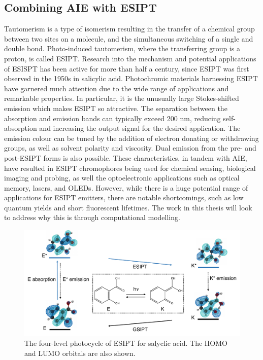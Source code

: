 \subsection{Combining AIE with ESIPT}
Tautomerism is a type of isomerism resulting in the transfer of a chemical group between two sites on a molecule, and the simultaneous switching of a single and double bond. Photo-induced tautomerism, where the transferring group is a proton, is called \acf{ESIPT}. Research into the mechanism and potential applications of ESISPT has been active for more than half a century, since \ac{ESIPT} was first observed in the 1950s in salicylic acid.\cite{Weller1955} Photochromic materials harnessing \ac{ESIPT} have garnered much attention due to the wide range of applications and remarkable properties. In particular, it is the unusually large Stokes-shifted emission which makes \ac{ESIPT} so attractive. The separation between the absorption and emission bands can typically exceed 200 nm, reducing self-absorption and increasing the output signal for the desired application. The emission colour can be tuned by the addition of electron donating or withdrawing groups, as well as solvent polarity and viscosity.\cite{Azarias2016,Yushchenko2007} Dual emission from the pre- and post-\ac{ESIPT} forms is also possible. These characteristics, in tandem with \ac{AIE}, have resulted in \ac{ESIPT} chromophores being used for chemical sensing, biological imaging and probing, as well the optoelectronic applications such as optical memory, lasers, and \acp{OLED}.\cite{Hsieh2010,Kwon2011,Zhao2012,Demchenko2013,Padalkar2015,Chen2018} However, while there is a huge potential range of applications for ESIPT emitters, there are notable shortcomings, such as low quantum yields and short fluorescent lifetimes.\cite{Padalkar2015} The work in this thesis will look to address why this is through computational modelling.
\begin{figure}[t]
\centering
  \includegraphics[width=0.95\linewidth]{1Intro/ESIPT.pdf}
  \caption[The four-level photocycle of \ac{ESIPT}]{The four-level photocycle of \ac{ESIPT} for salyclic acid. The HOMO and LUMO orbitals are also shown.}
  \label{figure: ESIPT}
\end{figure}
